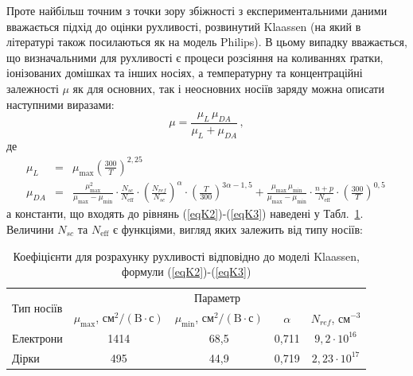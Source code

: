 \documentclass[12pt,a4paper,titlepage,oneside]{book}
\numberwithin{equation}{part}
\begin{document}
Проте найбільш точним з точки зору збіжності з експериментальними даними вважається підхід до оцінки рухливості, розвинутий   Klaassen \cite{KLAASSEN953}
(на який в  літературі також посилаються як на модель Philips).
В цьому випадку вважається, що визначальними для рухливості є процеси розсіяння на коливаннях ґратки, іонізованих домішках та інших носіях, а температурну та
концентраційні залежності $\mu$ як для основних, так і неосновних носіїв заряду можна описати наступними виразами:
\begin{equation}\label{eqK1}
  \mu=\frac{\mu_L\,\mu_{DA}}{\mu_L+\mu_{DA}}\,,
\end{equation}
де
\begin{eqnarray}
  \label{eqK2}
  \mu_L &=&  \mu_\mathrm{max} \left(\frac{300}{T}\right)^{2,25}\, \\ \label{eqK3}
  \mu_{DA}  &=& \frac{\mu_\mathrm{max}^2}{\mu_\mathrm{max} - \mu_\mathrm{min}} \cdot
    \frac{N_{sc}}{N_\mathrm{eff}} \cdot \left(\frac{N_{ref}}{N_{sc}}\right)^{\alpha} \cdot \left(\frac{T}{300}\right)^{3\alpha - 1,5}
    + \frac{\mu_\mathrm{max} \, \mu_\mathrm{min}}{\mu_\mathrm{max} - \mu_\mathrm{min}} \cdot \frac{n + p}{N_\mathrm{eff}} \cdot \left(\frac{300}{T}\right)^{0,5}\,
\end{eqnarray}
а константи, що входять до рівнянь (\ref{eqK2})-(\ref{eqK3}) наведені у Табл.~\ref{tblK1}.
Величини $N_{sc}$ та $N_\mathrm{eff}$ є функціями, вигляд яких залежить від типу носіїв:

\begin{table}
\caption{Коефіцієнти для розрахунку рухливості відповідно до моделі Klaassen, формули (\ref{eqK2})-(\ref{eqK3})}
\label{tblK1}
\centering
\begin{tabular}{|l|c|c|c|c|}
\hline
\multirow{2}{*}{Тип носіїв} & \multicolumn{4}{c|}{Параметр} \\
\cline{2-5}
&$\mu_\mathrm{max}$, $\text{см}^2/(\text{B}\cdot\text{с})$&$\mu_\mathrm{min}$, $\text{см}^2/(\text{B}\cdot\text{с})$&$\alpha$&$N_{ref}$, см$^{-3}$ \rule{0pt}{13pt}\\
\hline
Електрони&1414&68,5&0,711&$9,2\cdot10^{16}$\\
Дірки&495&44,9&0,719&$2,23\cdot10^{17}$\\
\hline
\end{tabular}
\end{table}
\end{document}
